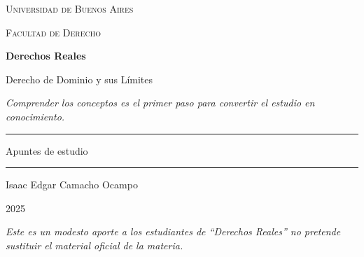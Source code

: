 \documentclass[12pt,oneside]{book}
\newcommand{\universidad}{Universidad de Buenos Aires}
\newcommand{\facultad}{Facultad de Derecho}
\newcommand{\materia}{Derechos Reales}
\newcommand{\titulo}{Derecho de Dominio y sus L\'imites}
\newcommand{\autor}{Isaac Edgar Camacho Ocampo}
\newcommand{\anio}{2025}
\begin{document}
\begin{titlepage}

\thispagestyle{empty}

\begin{center}

\vspace*{1cm}

{\large \textsc{\universidad}}

\vspace{0.2cm}

{\large \textsc{\facultad}}

\vspace{3cm}

{\Huge \textbf{\materia}}

\vspace{1cm}

{\LARGE \titulo}

\vspace{0.8cm}

\textit{Comprender los conceptos es el primer paso para convertir el estudio en conocimiento.}

\vspace{1.2cm}

\rule{0.70\textwidth}{0.5pt}

\vspace{0.5cm}

{\large Apuntes de estudio}

\vspace{0.5cm}

\rule{0.70\textwidth}{0.5pt}

\vfill

{\large \autor}

\vspace{0.3cm}

{\large \anio}

\end{center}

\vfill

\begin{flushleft}
\textit{Este es un modesto aporte a los estudiantes de ``\materia'' no pretende sustituir el material oficial de la materia.}
\end{flushleft}

\end{titlepage}

\tableofcontents
\end{document}
